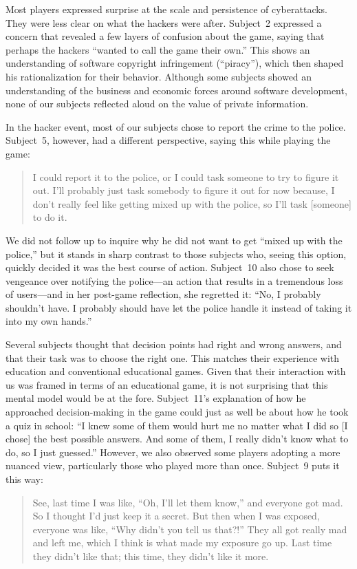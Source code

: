 \documentclass[letterpaper]{article}
\begin{document}
Most players expressed surprise at the scale and persistence
of cyberattacks. They were less clear on what the hackers
were after. Subject~2 expressed a concern that revealed a few
layers of confusion about the game, saying that perhaps the
hackers ``wanted to call the game their own.''
This shows an understanding of software copyright infringement (``piracy''),
which then shaped his rationalization for their behavior.
Although some subjects showed an understanding of the business and
economic forces around software development, none of our subjects
reflected aloud on the value of private information.

In the hacker event, most of our subjects chose to report the
crime to the police. Subject~5, however, had a different
perspective, saying this while playing the game: 
\begin{quote}
I could report it to the police, or I could task someone to try to
figure it out. I'll probably just task somebody to figure it out for now
because, I don't really feel like getting mixed up with the police,
so I'll task [someone] to do it.
\end{quote}
We did not follow up to inquire why he did not want to get ``mixed up
with the police,'' but it stands in sharp contrast to those subjects
who, seeing this option, quickly decided it was the best course of
action.  Subject~10 also chose to seek vengeance over
notifying the police---an action that results in a tremendous loss of
users---and in her post-game reflection, she regretted it:
``No, I probably shouldn't have. I probably should have let
the police handle it instead of taking it into my own hands.''

Several subjects thought that decision points had right and wrong
answers, and that their task was to choose the right one.
This matches their experience with education and conventional
educational games. Given that their interaction with us was framed in terms
of an educational game, it is not surprising that this mental model
would be at the fore.
Subject~11's explanation of how he approached decision-making in the
game could just as well be about how he took a quiz in school:
``I knew some of them would hurt me no matter what I did so [I chose] the
best possible answers. And some of them, I really didn't know what to do,
so I just guessed.''
However, we also observed some players adopting a more nuanced view,
particularly those who played more than once. Subject~9 puts it this way:
\begin{quote}
See, last time I was like, ``Oh, I'll let them know,'' and everyone
got mad. So I thought I'd just keep it a secret.
But then when I was exposed, everyone was like,
 ``Why didn't you tell us that?!''
They all got really mad and left me, which I think is what made my exposure
go up. Last time they didn't like that; this time, they didn't like it more.
\end{quote}
\end{document}
